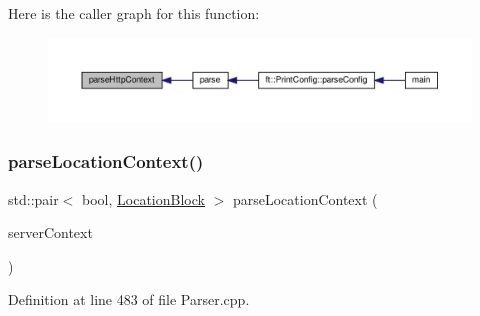 Here is the caller graph for this function\+:
\nopagebreak
\begin{figure}[H]
\begin{center}
\leavevmode
\includegraphics[width=350pt]{classft_1_1_parser_a17a213759b2cca8e91ca225b2e86739d_icgraph}
\end{center}
\end{figure}
\mbox{\label{classft_1_1_parser_a87f0f31d2bc2e6357d522e70256878ca}} 
\subsubsection{\texorpdfstring{parse\+Location\+Context()}{parseLocationContext()}}
{\footnotesize\ttfamily std\+::pair$<$ bool, \hyperlink{classft_1_1_location_block}{Location\+Block} $>$ parse\+Location\+Context (\begin{DoxyParamCaption}\item[{\hyperlink{classft_1_1_server_block}{Server\+Block} \&}]{server\+Context }\end{DoxyParamCaption})\hspace{0.3cm}{\ttfamily [private]}}



Definition at line 483 of file Parser.\+cpp.


